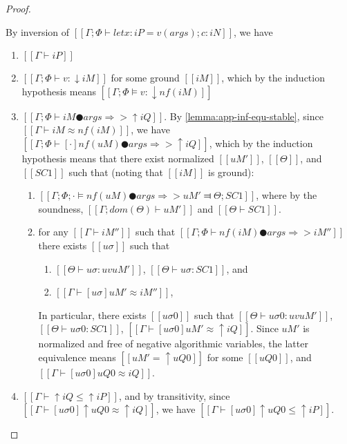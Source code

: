 \begin{proof}
\begin{caseof}
            By inversion of 
            $[[Γ ; Φ ⊢ let x:iP = v(args); c : iN]]$,
            we have
            \begin{enumerate}
                \item $[[Γ ⊢ iP]]$
                \item $[[Γ ; Φ ⊢ v : ↓iM]]$ for some ground $[[iM]]$,
                    which by the induction hypothesis means
                    $[[Γ ; Φ ⊨ v : ↓nf(iM)]]$
                \item $[[Γ ; Φ ⊢ iM ● args ⇒> ↑iQ]]$. 
                    By \cref{lemma:app-inf-equ-stable}, since
                    $[[Γ ⊢ iM ≈ nf(iM)]]$, we have
                    $[[Γ ; Φ ⊢ [·]nf(uM) ● args ⇒> ↑iQ]]$, 
                    which by the induction hypothesis means 
                    that there exist normalized 
                    $[[uM']]$, $[[Θ]]$, and $[[SC1]]$ such that
                    (noting that $[[iM]]$ is ground):
                    \begin{enumerate}
                        \item $[[ Γ; Φ; · ⊨ nf(uM) ● args ⇒> uM' ⫤ Θ; SC1 ]]$,
                            where by the soundness, $[[Γ; dom(Θ) ⊢ uM']]$ and $[[Θ ⊢ SC1]]$.
                        \item for any $[[Γ ⊢ iM'']]$ 
                            such that $[[Γ; Φ ⊢ nf(iM) ● args ⇒> iM'']]$
                            there exists $[[uσ]]$ such that 
                            \begin{enumerate}
                                \item $[[ Θ ⊢ uσ : uv uM' ]]$, $[[ Θ ⊢ uσ : SC1 ]]$, and 
                                \item $[[Γ ⊢ [uσ]uM' ≈ iM'']]$,
                            \end{enumerate}
                            In particular, there exists
                            $[[uσ0]]$
                            such that 
                            $[[ Θ ⊢ uσ0 : uv uM']]$,
                            $[[ Θ ⊢ uσ0 : SC1]]$,
                            $[[Γ ⊢ [uσ0]uM' ≈ ↑iQ]]$.
                            Since $uM'$ is normalized and free of negative algorithmic variables,
                            the latter equivalence means
                            $[[uM' = ↑uQ0]]$ for some $[[uQ0]]$, and $[[Γ ⊢ [uσ0]uQ0 ≈ iQ]]$.
                    \end{enumerate}
                \item $[[Γ ⊢ ↑iQ ≤ ↑iP]]$,
                    and by transitivity, since $[[Γ ⊢ [uσ0]↑uQ0 ≈ ↑iQ]]$,
                    we have $[[Γ ⊢ [uσ0]↑uQ0 ≤ ↑iP]]$.
                    

\end{enumerate}
\end{caseof}
\end{proof}
